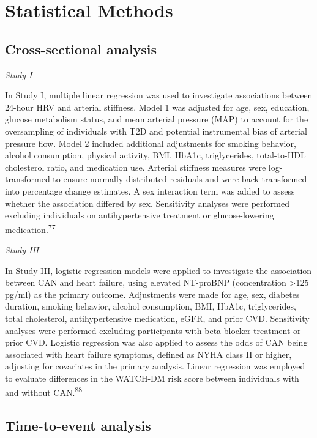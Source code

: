 \documentclass[
  a4paper,
  headsepline=true,
  open=any]{scrbook}
\begin{document}
\hypertarget{statistical-methods}{%
\section{Statistical Methods}\label{statistical-methods}}

\hypertarget{cross-sectional-analysis}{%
\subsection{Cross-sectional analysis}\label{cross-sectional-analysis}}

\emph{Study I}

In Study I, multiple linear regression was used to investigate
associations between 24-hour HRV and arterial stiffness. Model 1 was
adjusted for age, sex, education, glucose metabolism status, and mean
arterial pressure (MAP) to account for the oversampling of individuals
with T2D and potential instrumental bias of arterial pressure flow.
Model 2 included additional adjustments for smoking behavior, alcohol
consumption, physical activity, BMI, HbA1c, triglycerides, total-to-HDL
cholesterol ratio, and medication use. Arterial stiffness measures were
log-transformed to ensure normally distributed residuals and were
back-transformed into percentage change estimates. A sex interaction
term was added to assess whether the association differed by sex.
Sensitivity analyses were performed excluding individuals on
antihypertensive treatment or glucose-lowering
medication.\textsuperscript{77}

\emph{Study III}

In Study III, logistic regression models were applied to investigate the
association between CAN and heart failure, using elevated NT-proBNP
(concentration \textgreater125 pg/ml) as the primary outcome.
Adjustments were made for age, sex, diabetes duration, smoking behavior,
alcohol consumption, BMI, HbA1c, triglycerides, total cholesterol,
antihypertensive medication, eGFR, and prior CVD. Sensitivity analyses
were performed excluding participants with beta-blocker treatment or
prior CVD. Logistic regression was also applied to assess the odds of
CAN being associated with heart failure symptoms, defined as NYHA class
II or higher, adjusting for covariates in the primary analysis. Linear
regression was employed to evaluate differences in the WATCH-DM risk
score between individuals with and without CAN.\textsuperscript{88}

\hypertarget{time-to-event-analysis}{%
\subsection{Time-to-event analysis}\label{time-to-event-analysis}}
\end{document}
